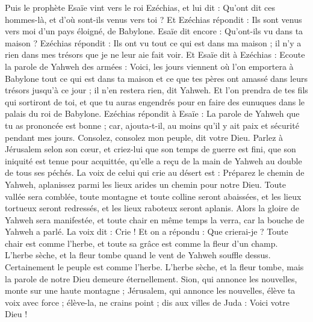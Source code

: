 \begin{multicols}{2}
Puis le prophète Esaïe vint vers le roi Ezéchias, et lui dit : Qu'ont dit ces hommes-là, et d'où sont-ils venus vers toi ? Et Ezéchias répondit : Ils sont venus vers moi d'un pays éloigné, de Babylone.
Esaïe dit encore : Qu'ont-ils vu dans ta maison ? Ezéchias répondit : Ils ont vu tout ce qui est dans ma maison ; il n'y a rien dans mes trésors que je ne leur aie fait voir.
Et Esaïe dit à Ezéchias : Ecoute la parole de Yahweh des armées :
Voici, les jours viennent où l'on emportera à Babylone tout ce qui est dans ta maison et ce que tes pères ont amassé dans leurs trésors jusqu'à ce jour ; il n'en restera rien, dit Yahweh.
Et l'on prendra de tes fils qui sortiront de toi, et que tu auras engendrés pour en faire des eunuques dans le palais du roi de Babylone.
Ezéchias répondit à Esaïe : La parole de Yahweh que tu as prononcée est bonne ; car, ajouta-t-il, au moins qu'il y ait paix et sécurité pendant mes jours.
\VerseOne{}Consolez, consolez mon peuple, dit votre Dieu.
Parlez à Jérusalem selon son cœur, et criez-lui que son temps de guerre est fini, que son iniquité est tenue pour acquittée, qu'elle a reçu de la main de Yahweh au double de tous ses péchés.
La voix de celui qui crie au désert est : Préparez le chemin de Yahweh, aplanissez parmi les lieux arides un chemin pour notre Dieu.
Toute vallée sera comblée, toute montagne et toute colline seront abaissées, et les lieux tortueux seront redressés, et les lieux raboteux seront aplanis.
Alors la gloire de Yahweh sera manifestée, et toute chair en même temps la verra, car la bouche de Yahweh a parlé.
La voix dit : Crie ! Et on a répondu : Que crierai-je ? Toute chair est comme l'herbe, et toute sa grâce est comme la fleur d'un champ.
L'herbe sèche, et la fleur tombe quand le vent de Yahweh souffle dessus. Certainement le peuple est comme l'herbe.
L'herbe sèche, et la fleur tombe, mais la parole de notre Dieu demeure éternellement.
Sion, qui annonce les nouvelles, monte sur une haute montagne ; Jérusalem, qui annonce les nouvelles, élève ta voix avec force ; élève-la, ne crains point ; dis aux villes de Juda : Voici votre Dieu !

\end{multicols}
